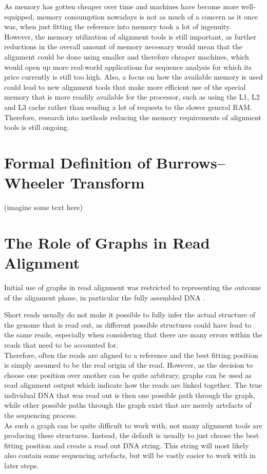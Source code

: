 \documentclass[a4paper,12pt,twoside,BCOR=10mm]{scrbook}
\begin{document}
As memory has gotten cheaper over time and machines have become more 
well-equipped, memory consumption nowadays is not as much of a concern 
as it once was, when just fitting the reference into memory 
took a lot of ingenuity. \\
However, the memory utilization of alignment tools is still important, 
as further reductions in the overall amount of memory necessary would 
mean that the alignment could be done using smaller and therefore cheaper 
machines, which would open up more real-world applications for sequence analysis 
for which its price currently is still too high.
Also, a focus on how the available memory is used could lead to new alignment 
tools that make more efficient use of the special memory that is more readily available 
for the processor, such as using the L1, L2 and L3 cache rather than sending a lot of 
requests to the slower general RAM. \\
Therefore, research into methods reducing the memory requirements of alignment tools 
is still ongoing.

\section{Formal Definition of Burrows--Wheeler Transform}

(imagine some text here)

\section{The Role of Graphs in Read Alignment}

Initial use of graphs in read alignment was restricted to representing 
the outcome of the alignment phase, in particular the fully assembled DNA \citep{Myers2005}.

Short reads usually do not make it possible to fully infer the actual structure of the genome that is read out, 
as different possible structures could have lead to the same reads, especially when considering that 
there are many errors within the reads that need to be accounted for. \\
Therefore, often the reads are aligned to a reference and the best fitting position is simply 
assumed to be the real origin of the read. However, as the decision to choose one position over 
another can be quite arbitrary, graphs can be used as read alignment output which indicate how the reads 
are linked together. The true individual DNA that was read out is then one possible path through the graph, 
while other possible paths through the graph exist that are merely artefacts of the sequencing process. \\
As such a graph can be quite difficult to work with, not many alignment tools are producing these 
structures. Instead, the default is usually to just choose the best fitting position and 
create a read out DNA string. This string will most likely also contain some sequencing artefacts, 
but will be vastly easier to work with in later steps.
\end{document}
